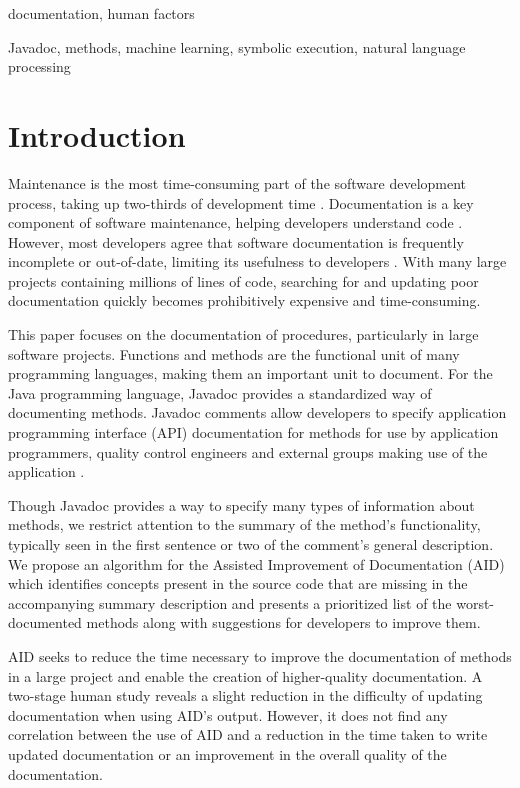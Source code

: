 \documentclass[preprint]{sigplanconf}
\begin{document}
\terms
documentation, human factors

\keywords
Javadoc, methods, machine learning, symbolic execution, natural language processing

\section{Introduction}
Maintenance is the most time-consuming part of the software development process, taking up two-thirds of development time \cite{buse10}. Documentation is a key component of software maintenance, helping developers understand code \cite{desouza}. However, most developers agree that software documentation is frequently incomplete or out-of-date, limiting its usefulness to developers \cite{lethbridge}. With many large projects containing millions of lines of code, searching for and updating poor documentation quickly becomes prohibitively expensive and time-consuming.

This paper focuses on the documentation of procedures, particularly in large software projects. Functions and methods are the functional unit of many programming languages, making them an important unit to document. For the Java programming language, Javadoc provides a standardized way of documenting methods. Javadoc comments allow developers to specify application programming interface (API) documentation for methods for use by application programmers, quality control engineers and external groups making use of the application \cite{kramer}.

Though Javadoc provides a way to specify many types of information about methods, we restrict attention to the summary of the method's functionality, typically seen in the first sentence or two of the comment's general description. We propose an algorithm for the Assisted Improvement of Documentation (AID) which identifies concepts present in the source code that are missing in the accompanying summary description and presents a prioritized list of the worst-documented methods along with suggestions for developers to improve them.

AID seeks to reduce the time necessary to improve the documentation of methods in a large project and enable the creation of higher-quality documentation. A two-stage human study reveals a slight reduction in the difficulty of updating documentation when using AID's output. However, it does not find any correlation between the use of AID and a reduction in the time taken to write updated documentation or an improvement in the overall quality of the documentation.
\end{document}
